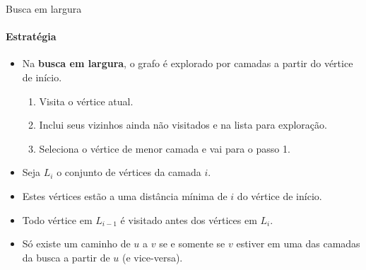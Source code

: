 \begin{frame}{Busca em largura}
	\framesubtitle{Estratégia}
	
	\begin{itemize}
		\item Na \textbf{\color{magenta}busca em largura}, o grafo é explorado por camadas a partir do vértice de início.
		
		\begin{enumerate}
			\item Visita o vértice atual.
			\item Inclui seus vizinhos ainda não visitados e na lista para exploração.
			\item Seleciona o vértice de menor camada e vai para o passo 1.
		\end{enumerate}
	
		\medskip
		\item Seja $L_i$ o conjunto de vértices da camada $i$.
		\item Estes vértices estão a uma distância mínima de $i$ do vértice de início.
		\item Todo vértice em $L_{i-1}$ é visitado antes dos vértices em $L_i$.
		\item Só existe um caminho de $u$ a $v$ se e somente se $v$ estiver em uma das camadas da busca a partir de $u$ (e vice-versa).
	\end{itemize}
\end{frame}



